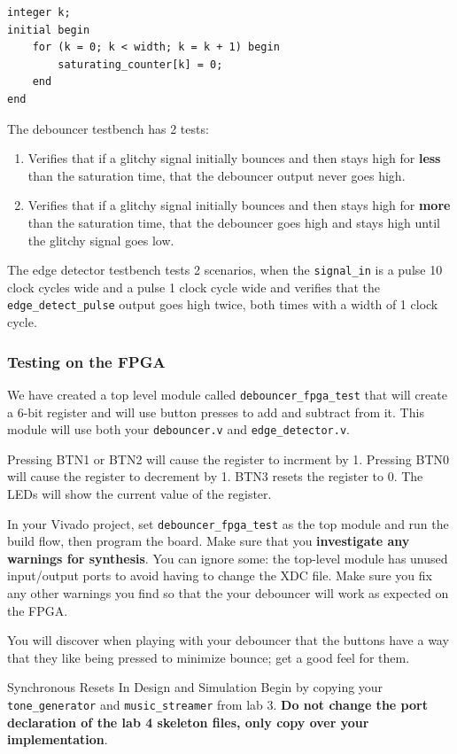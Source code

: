 \documentclass[11pt]{article}
\makeatletter
\renewcommand{\section}
{\@startsection {section}{1}{0pt}
 {-2ex}
 {1ex}
 {\bfseries\Large}}
\makeatother
\begin{document}
\begin{verbatim}
integer k;
initial begin
	for (k = 0; k < width; k = k + 1) begin
		saturating_counter[k] = 0;
	end
end
\end{verbatim}

The debouncer testbench has 2 tests:
\begin{enumerate}
	\item Verifies that if a glitchy signal initially bounces and then stays high for \textbf{less} than the saturation time, that the debouncer output never goes high.
	\item Verifies that if a glitchy signal initially bounces and then stays high for \textbf{more} than the saturation time, that the debouncer goes high and stays high until the glitchy signal goes low.
\end{enumerate}

The edge detector testbench tests 2 scenarios, when the \verb|signal_in| is a pulse 10 clock cycles wide and a pulse 1 clock cycle wide and verifies that the \verb|edge_detect_pulse| output goes high twice, both times with a width of 1 clock cycle.

\subsubsection{Testing on the FPGA}
We have created a top level module called \verb|debouncer_fpga_test| that will create a 6-bit register and will use button presses to add and subtract from it. This module will use both your \verb|debouncer.v| and \verb|edge_detector.v|.

Pressing BTN1 or BTN2 will cause the register to incrment by 1. Pressing BTN0 will cause the register to decrement by 1. BTN3 resets the register to 0. The LEDs will show the current value of the register.

In your Vivado project, set \verb|debouncer_fpga_test| as the top module and run the build flow, then program the board. Make sure that you \textbf{investigate any warnings for synthesis}. You can ignore some: the top-level module has unused input/output ports to avoid having to change the XDC file. Make sure you fix any other warnings you find so that the your debouncer will work as expected on the FPGA.

You will discover when playing with your debouncer that the buttons have a way that they like being pressed to minimize bounce; get a good feel for them.


\section{Synchronous Resets In Design and Simulation}
Begin by copying your \verb|tone_generator| and \verb|music_streamer| from lab 3. \textbf{Do not change the port declaration of the lab 4 skeleton files, only copy over your implementation}.
\end{document}
